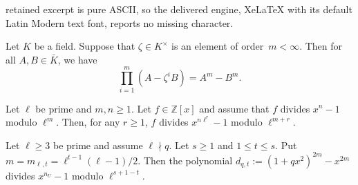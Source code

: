 \documentclass[10pt,a4paper]{amsart}
\begin{document}
retained excerpt is pure ASCII, so the delivered engine, XeLaTeX with its default Latin Modern text font, reports no missing character.
\begin{lemma}\label{lem:rootofunity}
    Let $K$ be a field. Suppose that $\zeta \in K^\times$ is an element of order~$m < \infty$. Then for all $A, B \in \bar{K}$, we have
    \[
    \prod_{i=1}^m (A - \zeta^iB) = A^m - B^m.
    \]
\end{lemma}

\begin{lemma}\label{lem:div_upgrade}
    Let $\ell$ be prime and $m,n \geq 1$. Let $f \in \mathbb Z[x]$ and assume that $f$ divides $x^n - 1$ modulo $\ell^m$. Then, for any $r \geq 1$, $f$ divides $x^{n \ell^r} - 1$ modulo $\ell^{m+r}$.
\end{lemma}

\begin{lemma}\label{lem:denom_divisible}
     Let $\ell \geq 3$ be prime and assume $\ell \nmid q$.
     Let $s \geq 1$ and $1 \leq t \leq s$. Put $m = m_{\ell,t} = \ell^{t-1}(\ell-1)/2$. Then the polynomial $d_{q,t} := (1+qx^2)^{2m} - x^{2m}$ divides $x^{n_{U}}-1$ modulo $\ell^{s+1-t}$.
\end{lemma}
\end{document}
